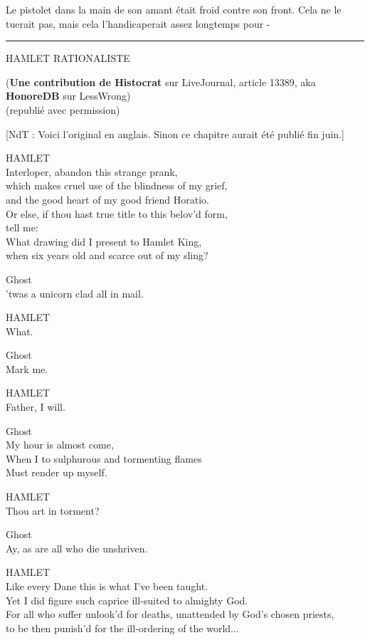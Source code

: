 Le pistolet dans la main de son amant était froid contre son front. Cela ne le tuerait pas, mais cela l'handicaperait assez longtemps pour -
\par\noindent\rule{\textwidth}{0.4pt}

\begin{center}HAMLET RATIONALISTE\end{center}



\begin{center}(\textbf{Une contribution de Histocrat } sur LiveJournal, article 13389, aka \textbf{HonoreDB } sur LessWrong)\\(republié avec permission)\end{center}


[NdT : Voici l'original en anglais. Sinon ce chapitre aurait été publié fin juin.]

HAMLET\\Interloper, abandon this strange prank,\\which makes cruel use of the blindness of my grief,\\and the good heart of my good friend Horatio.\\Or else, if thou hast true title to this belov'd form,\\tell me:\\What drawing did I present to Hamlet King,\\when six years old and scarce out of my sling?

Ghost\\'twas a unicorn clad all in mail.

HAMLET\\What.

Ghost\\Mark me.

HAMLET\\Father, I will.

Ghost\\My hour is almost come,\\When I to sulphurous and tormenting flames\\Must render up myself.

HAMLET\\Thou art in torment?

Ghost\\Ay, as are all who die unshriven.

HAMLET\\Like every Dane this is what I've been taught.\\Yet I did figure such caprice ill-suited to almighty God.\\For all who suffer unlook'd for deaths, unattended by God's chosen priests,\\to be then punish'd for the ill-ordering of the world...

